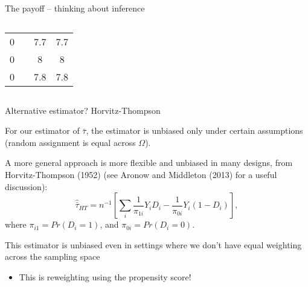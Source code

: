 \documentclass[notes,11pt, aspectratio=169]{beamer}
\newenvironment{wideitemize}{\itemize\addtolength{\itemsep}{10pt}}{\enditemize}
\begin{document}
\begin{frame}{The payoff -- thinking about inference}
\begin{columns}[T]
\begin{column}{.4\textwidth}
{\begin{tabular}{cccc}
      0 &   &  7.7  & 7.7\\
      0 &   &  8 & 8  \\
      0 &   & 7.8 & 7.8\\
      \bottomrule
      \end{tabular}
    }
  \end{column}%
\end{columns}
\end{frame}

\begin{frame}{Alternative estimator? Horvitz-Thompson}
  \begin{wideitemize}
  \item For our estimator of $\bar{\tau}$, the estimator is unbiased
    only under certain assumptions (random assignment is equal across
    $\Omega$).
  \item A more general approach is more flexible and unbiased in many
    designs, from Horvitz-Thompson (1952) (see Aronow and Middleton
    (2013) for a useful discussion):
    \begin{equation}
      \hat{\bar{\tau}}_{HT} = n^{-1}\left[\sum_{i}\frac{1}{\pi_{1i}}Y_{i}D_{i} - \frac{1}{\pi_{0i}}Y_{i}(1-D_{i})\right],
    \end{equation}
    where $\pi_{i1} = Pr(D_{i} = 1)$, and $\pi_{0i} = Pr(D_{i} = 0)$.
  \item This estimator is unbiased even in settings where we don't have equal
    weighting across the sampling space
    \begin{itemize}
    \item This is reweighting using the propensity score!
    \end{itemize}
  \end{wideitemize}
\end{frame}
\end{document}
